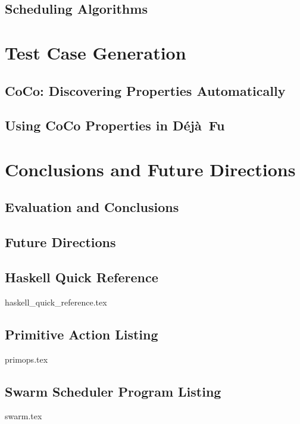 \documentclass[openright,imperial,11pt]{octavo}
\newcommand{\dejafu}{D\'{e}j\`{a}~Fu}
\begin{document}
\chapter{Scheduling Algorithms}
\label{chp:algorithms}


\part{Test Case Generation}
\label{part:properties}

\chapter{CoCo: Discovering Properties Automatically}
\label{chp:coco}


\chapter{Using CoCo Properties in \dejafu{}}
\label{chp:coco_and_dejafu}


\part{Conclusions and Future Directions}
\label{part:end}

\chapter{Evaluation and Conclusions}
\label{chp:conclusions}


\chapter{Future Directions}
\label{chp:future_work}


\begin{appendices}
\chapter{Haskell Quick Reference}
\label{app:haskell}
{haskell_quick_reference.tex}

\chapter{Primitive Action Listing}
\label{app:primops}
{primops.tex}

\chapter{Swarm Scheduler Program Listing}
\label{app:swarm}
{swarm.tex}
\end{appendices}

\printbibliography[heading=bibintoc]
\end{document}
